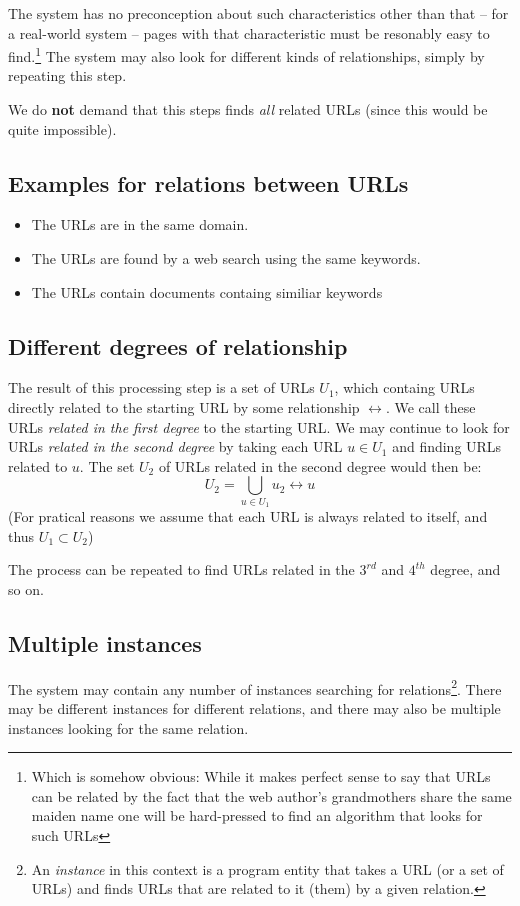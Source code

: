\documentclass[a4paper]{danarticle}
\begin{document}
     The system has no preconception about such characteristics other
     than that -- for a real-world system -- pages with that 
     characteristic must be resonably easy to 
     find.\footnote{Which is somehow
     obvious: While it makes perfect sense to say that URLs can
     be related by the fact that the web author's grandmothers share
     the same maiden name one will be hard-pressed to find an
     algorithm that looks for such URLs} The system may also
     look for different kinds of relationships, simply by
     repeating this step.
     
     We do \textbf{not} demand that this steps finds \textit{all}
     related URLs (since this would be quite impossible).
     
     \subsection*{Examples for relations between URLs}
       \begin{itemize}
         \item{The URLs are in the same domain.}
         \item{The URLs are found by a web search using the same keywords.}
         \item{The URLs contain documents containg similiar keywords}
       \end{itemize}
     
     \subsection*{Different degrees of relationship}
       The result of this processing step is a set of URLs $ U_{1} $,
       which containg URLs directly related to the starting
       URL by some relationship $ \leftrightarrow $. 
       We call these URLs \textit{related in the
       first degree} to the starting URL.
       We may continue to look for URLs \textit{related in the second
       degree} by taking each URL $ u \in U_1 $ and finding URLs related
       to $ u $. The set $ U_2 $ of URLs related in the second degree would
       then be:
       \[
        U_2 = \bigcup_{u \in U_1} u_2 \leftrightarrow u
       \]
       (For pratical reasons we assume that each URL is always related
       to itself, and thus $ U_1 \subset U_2 $)
       
       The process can be repeated to find URLs related in the 
       $ 3^{rd} $ and $ 4^{th} $ degree, and so on.
     \subsection*{Multiple instances}
       The system may contain any number of instances searching
       for relations\footnote{An \textit{instance} in this
       context is a program entity that takes a URL (or a
       set of URLs) and finds URLs that are related to it (them)
       by a given relation.}. There may be different instances
       for different relations, and there may also be multiple
       instances looking for the same relation. 
       
\end{document}
